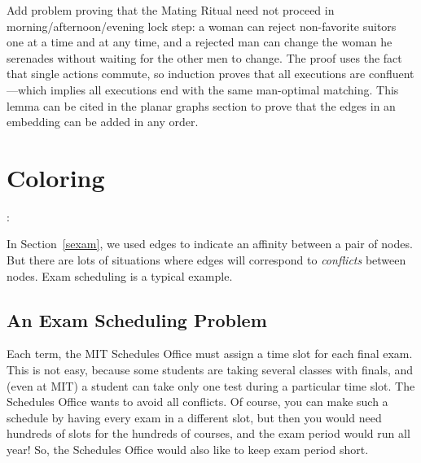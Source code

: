 \begin{problems}

\practiceproblems
{}

\classproblems

\homeworkproblems
{}


\begin{editingnotes}
\begin{problem*}
Add problem proving that the Mating Ritual need not proceed in
morning/afternoon/evening lock step: a woman can reject non-favorite
suitors one at a time and at any time, and a rejected man can change
the woman he serenades without waiting for the other men to change.
The proof uses the fact that single actions commute, so induction
proves that all executions are confluent---which implies all
executions end with the same man-optimal matching.  This lemma can be
cited in the planar graphs section to prove that the edges in an
embedding can be added in any order.
\end{problem*}
\end{editingnotes}

\end{problems}


\section{Coloring}\label{sec:coloring}

\begin{editingnotes}
:
\end{editingnotes}

In Section~\ref{sexam}, we used edges to indicate an affinity between a
pair of nodes.  But there are lots of situations where edges will
correspond to \emph{conflicts} between nodes.  Exam scheduling is a
typical example.

\subsection{An Exam Scheduling Problem}

Each term, the MIT Schedules Office must assign a time slot for each
final exam.  This is not easy, because some students are taking
several classes with finals, and (even at MIT) a student can take only
one test during a particular time slot.  The Schedules Office wants to
avoid all conflicts.  Of course, you can make such a schedule by
having every exam in a different slot, but then you would need
hundreds of slots for the hundreds of courses, and the exam period
would run all year!  So, the Schedules Office would also like to keep
exam period short.

